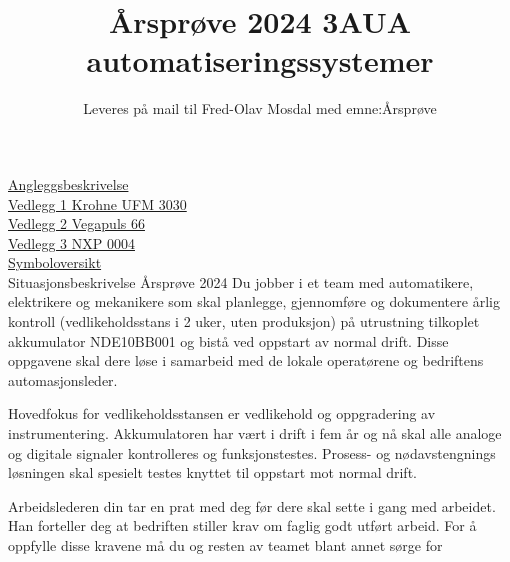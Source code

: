 \documentclass[12pt,a4paper]{article}
\begin{document}
\title{Årsprøve 2024 3AUA automatiseringssystemer}
\author{Leveres på mail til Fred-Olav Mosdal med emne:Årsprøve}
\maketitle
\href{https://rfka-my.sharepoint.com/:b:/g/personal/fred-olav_mosdal_skole_rogfk_no/EX2NSNlNAUBAiXgV4bY635sBs2AgR988B3WfM6rRxccZ4w?e=fJK93X}{Angleggsbeskrivelse}\\
\href{https://rfka-my.sharepoint.com/:b:/g/personal/fred-olav_mosdal_skole_rogfk_no/EQ2OEMJGIXFJoMyoB40eFI8BjiayYXByMvUzEM8L6Pys_Q?e=aNoTGF}{Vedlegg 1 Krohne UFM 3030}\\
\href{https://rfka-my.sharepoint.com/:b:/g/personal/fred-olav_mosdal_skole_rogfk_no/ESrkbpSQtQJJvCxtDD68DP8BnyQyh2LqUFdKkSv97DNSxw?e=dgDBLg}{Vedlegg 2 Vegapuls 66}\\
\href{https://rfka-my.sharepoint.com/:b:/g/personal/fred-olav_mosdal_skole_rogfk_no/Ee5-_de_63hNrPSWLENtxkUBD28u1ZM9XAiQ2WMyMqOYfw?e=hUWTVH}{Vedlegg 3 NXP 0004}\\
\href{https://rfka-my.sharepoint.com/:b:/g/personal/fred-olav_mosdal_skole_rogfk_no/ESrkbpSQtQJJvCxtDD68DP8BnyQyh2LqUFdKkSv97DNSxw?e=dgDBLg}{Symboloversikt}\\




\Large Situasjonsbeskrivelse Årsprøve 2024 
\normalsize 
\vskip  0.25cm
Du jobber i et team med automatikere, elektrikere og mekanikere som skal planlegge, gjennomføre og dokumentere årlig kontroll (vedlikeholdsstans i 2 uker, uten produksjon) på utrustning tilkoplet akkumulator NDE10BB001 og bistå ved oppstart av normal drift. Disse oppgavene skal dere løse i samarbeid med de lokale operatørene og bedriftens automasjonsleder.  


\vskip  0.25cm
Hovedfokus for vedlikeholdsstansen er vedlikehold og oppgradering av instrumentering. Akkumulatoren har vært i drift i fem år og nå skal alle analoge og digitale signaler kontrolleres og funksjonstestes. Prosess- og nødavstengnings løsningen skal spesielt testes knyttet til oppstart mot normal drift. 

\vskip  0.25cm
Arbeidslederen din tar en prat med deg før dere skal sette i gang med arbeidet. Han forteller deg at bedriften stiller krav om faglig godt utført arbeid. For å oppfylle disse kravene må du og resten av teamet blant annet sørge for  
\end{document}
